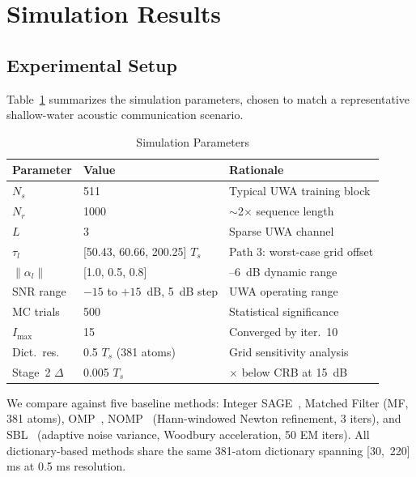 \documentclass[a4paper,fleqn]{cas-dc}
\begin{document}
\section{Simulation Results}
\label{sec:results}

\subsection{Experimental Setup}

Table~\ref{tab:params} summarizes the simulation parameters, chosen to match a representative shallow-water acoustic communication scenario.

\begin{table}[width=.9\linewidth,cols=3,pos=h]
\centering
\caption{Simulation Parameters}
\label{tab:params}
\footnotesize
\begin{tabular*}{\tblwidth}{@{}ll>{\raggedright\arraybackslash}p{2.8cm}@{}}
\toprule
Parameter & Value & Rationale \\
\midrule
$N_s$ & 511 & Typical UWA training block \\
$N_r$ & 1000 & $\sim$2$\times$ sequence length \\
$L$ & 3 & Sparse UWA channel \\
$\tau_l$ & [50.43, 60.66, 200.25] $T_s$ & Path 3: worst-case grid offset \\
$\|\alpha_l\|$ & [1.0, 0.5, 0.8] & 0--6~dB dynamic range \\
SNR range & $-15$ to $+15$~dB, 5~dB step & UWA operating range \\
MC trials & 500 & Statistical significance \\
$I_{\max}$ & 15 & Converged by iter.~10 \\
Dict.\ res.\ & 0.5 $T_s$ (381 atoms) & Grid sensitivity analysis \\
Stage~2 $\Delta$ & 0.005 $T_s$ & 10$\times$ below CRB at 15~dB \\
\bottomrule
\end{tabular*}
\end{table}

We compare against five baseline methods: Integer SAGE~\cite{fleury1999}, Matched Filter (MF, 381 atoms), OMP~\cite{pati1993}, NOMP~\cite{mamandipoor2016} (Hann-windowed Newton refinement, 3 iters), and SBL~\cite{wipf2004} (adaptive noise variance, Woodbury acceleration, 50 EM iters). All dictionary-based methods share the same 381-atom dictionary spanning [30,~220] ms at 0.5 ms resolution.
\end{document}
